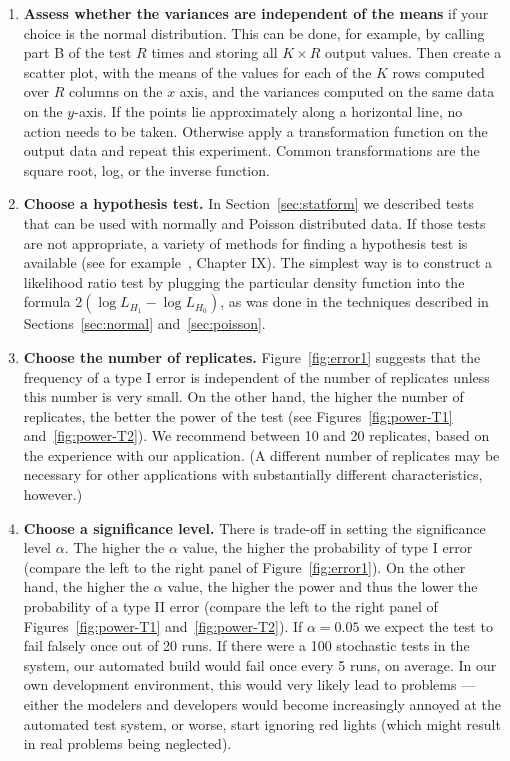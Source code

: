 \documentclass{sig-alternate}
\begin{document}
\begin{enumerate}
\item
\label{assess-variances}
{\bf Assess whether the variances are independent of the means} if your
choice is the normal distribution.  This can be done, for example, by
calling part B of the test $R$ times and storing all $K\times R$ output
values. Then create a scatter plot, with the means of the values for each
of the $K$ rows computed over $R$ columns on the $x$ axis, and the
variances computed on the same data on the $y$-axis.  If the points lie
approximately along a horizontal line, no action needs to be taken.
Otherwise apply a transformation function on the output data and repeat
this experiment.  Common transformations are the square root, log, or the
inverse function.

\item
\label{choose-hypothesis-test}
{\bf Choose a hypothesis test.}  In Section~\ref{sec:statform} we described
tests that can be used with normally and Poisson distributed data. If those
tests are not appropriate, a variety of methods for finding a hypothesis test
is available (see for example~\cite{mood-book-1974}, Chapter IX). The simplest
way is to construct a likelihood ratio test by plugging the particular density
function into the formula $2(\log L_{H_1} - \log L_{H_0})$, as was done in
the techniques described in Sections~\ref{sec:normal} and~\ref{sec:poisson}.

\item
{\bf Choose the number of replicates.}  Figure~\ref{fig:error1} suggests
that the frequency of a type I error is independent of the number of
replicates unless this number is very small. On the other hand, the higher
the number of replicates, the better the power of the test (see
Figures~\ref{fig:power-T1} and~\ref{fig:power-T2}). We recommend between 10
and 20 replicates, based on the experience with our application.  (A
different number of replicates may be necessary for other applications with
substantially different characteristics, however.)

\item
\label{choose-significance-level}
{\bf Choose a significance level.}  There is trade-off in setting the
significance level $\alpha$. The higher the $\alpha$ value, the higher the
probability of type I error (compare the left to the right panel of
Figure~\ref{fig:error1}). On the other hand, the higher the $\alpha$ value,
the higher the power and thus the lower the probability of a type II error
(compare the left to the right panel of
Figures~\ref{fig:power-T1} and~\ref{fig:power-T2}). If $\alpha=0.05$ we
expect the test to fail falsely once out of 20 runs.  If there were a 100
stochastic tests in the system, our automated build would fail once every 5
runs, on average.  In our own development environment, this would very
likely lead to problems --- either the modelers and developers would become
increasingly annoyed at the automated test system, or worse, start ignoring
red lights (which might result in real problems being neglected).
  

\end{enumerate}
\end{document}
